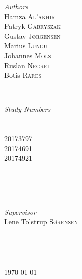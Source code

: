 \documentclass[12p]{article}
\begin{document}
\begin{titlepage}
	\begin{minipage}{0.4\textwidth}
    \begin{flushleft} \large
    \emph{Authors}\\
        Hamza \textsc{Al'akhir} \\
        Patryk \textsc{Gabryszak} \\
    	Gustav \textsc{Jørgensen} \\
    	Marius \textsc{Lungu} \\
    	Johannes \textsc{Mols} \\
    	Ruslan \textsc{Negrei} \\
    	Botis \textsc{Rares} \\
    \end{flushleft}
    \end{minipage}
    ~
    \begin{minipage}{0.4\textwidth}
    \begin{flushright} \large
    \emph{Study Numbers} \\
        - \\
        - \\
        20173797 \\
        20174691 \\
        20174921 \\
        - \\
        - \\
    \end{flushright}
    \end{minipage}\\[0.5cm]
    
    
    \begin{minipage}{0.4\textwidth}
    \begin{flushleft} \large
    \emph{Supervisor}\\
        Lene Tolstrup \textsc{Sørensen} \\
    \end{flushleft}
    \end{minipage}
    ~
    \begin{minipage}{0.4\textwidth}
    \begin{flushright} \large
    \end{flushright}
    \end{minipage}\\[0.5cm]

	
	\vfill\vfill\vfill %
	
	{\large\today} %
	
    
\end{titlepage}
\end{document}
